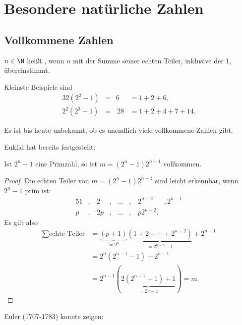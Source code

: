 \section{Besondere natürliche Zahlen}

\subsection{Vollkommene Zahlen}

\begin{df*}
	$n \in \N$ heißt , wenn $n$ mit der Summe seiner echten Teiler, inklusive der 1, übereinstimmt.
\end{df*}

\begin{ex*}
	Kleinste Beispiele sind
	\begin{alignat*}{3}
		2(2^2 - 1) &=& 6  &= 1 + 2 + 6, \\
		2^2(2^3 - 1) &=&\, 28 &= 1 + 2 + 4 + 7 + 14.
	\end{alignat*}
\end{ex*}

Es ist bis heute unbekannt, ob es unendlich viele vollkommene Zahlen gibt.


Euklid hat bereits festgestellt:

\begin{st*}[Euklid]
	Ist $2^n - 1$ eine Primzahl, so ist $m = (2^n - 1) 2^{n-1}$ vollkommen.
	\begin{proof}
		Die echten Teiler von $m = (2^n - 1) 2^{n-1}$ sind leicht erkennbar, wenn $2^n - 1$ prim ist:
		\begin{alignat*}{5}
			1&,&\, 2 &,&\, \dotsc&,&\, 2^{n-2} &, 2^{n-1} \\
			p&,&\, 2p&,&\, \dotsc&,&\, p2^{n-2}.
		\end{alignat*}
		Es gilt also
		\begin{align*}
			\sum \text{echte Teiler}
			&= \underbrace{(p + 1)}_{=2^n} \underbrace{(1 + 2 + \dotsb + 2^{n-2})}_{=2^{n-1} - 1} + 2^{n-1} \\
			&= 2^n (2^{n-1} - 1) + 2^{n-1} \\
			&= 2^{n-1} (\underbrace{2 (2^{n-1} - 1) + 1}_{=2^n - 1})
			= m.
		\end{align*}
	\end{proof}
\end{st*}

Euler (1707-1783) konnte zeigen:

